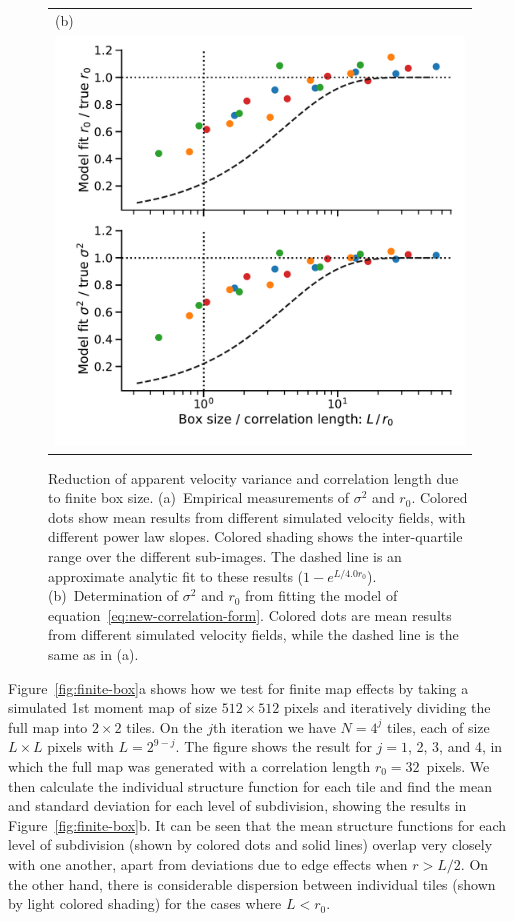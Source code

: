 \documentclass[fleqn,usenatbib, useAMS, a4paper]{mnras}
\newcommand\startNEW{\color{NEWcolor}}
\newcommand\stopNEW{\color{black}}
\newcommand\NEW[1]{\startNEW #1\stopNEW\relax}
\begin{document}
\begin{figure}
\begin{tabular}{@{} l @{}}
    (b)\\ \includegraphics[width=0.95\linewidth]{Figures/fake-finite-box-fits-ems-fluct_sigE_1}
  \end{tabular}
  \caption{
    Reduction of apparent velocity variance and correlation length
    due to finite box size.
    (a)~Empirical measurements of \(\sigma^2\) and \(r_0\).
    Colored dots show mean results from different simulated velocity fields,
    with different power law slopes.
    Colored shading shows the inter-quartile range over the different sub-images.
    The dashed line is an approximate analytic fit to these results
    (\NEW{\(1 - e^{L / 4.0r_0}\)}).
    (b)~Determination of \(\sigma^2\) and \(r_0\) from fitting the model
    of equation~\eqref{eq:new-correlation-form}.
    Colored dots are mean results from different simulated velocity fields,
    while the dashed line is the same as in (a).
  }
  \label{fig:finite-box-effect}
\end{figure}

\NEW{Figure~\ref{fig:finite-box}a} shows how we test for finite map effects by taking
a simulated \NEW{1st moment map of} size \(512 \times 512\) pixels and iteratively
dividing the full map into \(2 \times 2\) tiles.
On the \(j\)th iteration we have \(N = 4^j\) tiles,
each of size \(L \times L \) pixels with \(L = 2^{9 - j}\).
The figure shows the result for \(j = 1\), 2, 3, and 4, in which the full map
was generated with a correlation length \NEW{\(r_0 = 32\)~pixels}.
We then calculate the individual structure function for each tile and
find the mean and standard deviation for each level of subdivision,
showing the results in \NEW{Figure~\ref{fig:finite-box}b}.
It can be seen that the mean structure functions for each level
of subdivision (shown by colored dots and solid lines)
overlap very closely with one another, apart from deviations
due to edge effects when \(r > L/2\).
On the other hand, there is considerable dispersion between
individual tiles (shown by light colored shading) for the cases
where \(L < r_0\).
\end{document}
